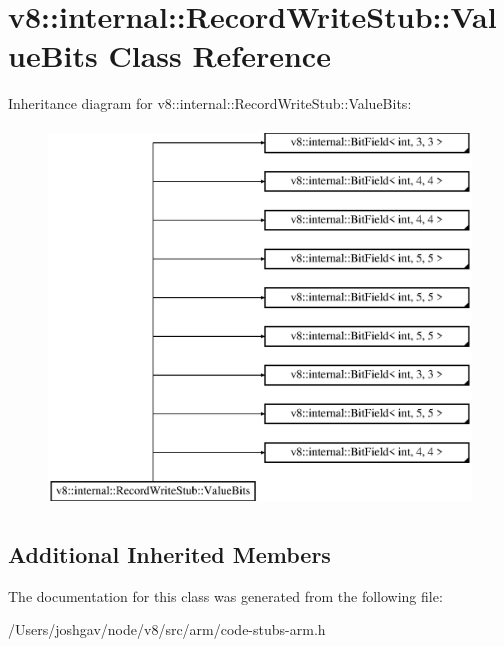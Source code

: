 \hypertarget{classv8_1_1internal_1_1_record_write_stub_1_1_value_bits}{}\section{v8\+:\+:internal\+:\+:Record\+Write\+Stub\+:\+:Value\+Bits Class Reference}
\label{classv8_1_1internal_1_1_record_write_stub_1_1_value_bits}
Inheritance diagram for v8\+:\+:internal\+:\+:Record\+Write\+Stub\+:\+:Value\+Bits\+:\begin{figure}[H]
\begin{center}
\leavevmode
\includegraphics[height=10.000000cm]{classv8_1_1internal_1_1_record_write_stub_1_1_value_bits}
\end{center}
\end{figure}
\subsection*{Additional Inherited Members}


The documentation for this class was generated from the following file\+:\begin{DoxyCompactItemize}
\item 
/\+Users/joshgav/node/v8/src/arm/code-\/stubs-\/arm.\+h\end{DoxyCompactItemize}

